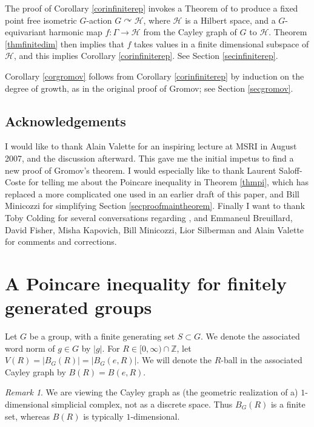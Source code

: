 \documentclass[12pt]{amsart}
\numberwithin{equation}{section}
\theoremstyle{plain}
\theoremstyle{remark}
\newtheorem{remark}[equation]{Remark}
\theoremstyle{definition}
\newcommand{\ra}{\rightarrow}
\newcommand{\h}{{\mathcal H}}
\newcommand{\Z}{\mathbb Z}
\newcommand{\acts}{\curvearrowright}
\def\ra{\rightarrow}
\begin{document}
\bigskip
The proof of Corollary \ref{corinfiniterep} invokes a Theorem 
of \cite{mok,korevaarschoen} to produce a fixed point
free isometric $G$-action $G\acts \h$, where $\h$ is 
a Hilbert space, and a $G$-equivariant
harmonic map $f:\Gamma\ra\h$ from the Cayley graph of $G$
to $\h$.  Theorem \ref{thmfinitedim} then implies that
$f$ takes values in a finite dimensional subspace of $\h$,
and this implies Corollary \ref{corinfiniterep}.
See Section \ref{secinfiniterep}.

\bigskip
Corollary \ref{corgromov} follows from Corollary \ref{corinfiniterep}
by induction on the degree of growth, as in the original 
proof of Gromov; see Section \ref{secgromov}.




\subsection{Acknowledgements}  I would like to
thank Alain Valette for an inspiring lecture 
at MSRI in August 2007, and the discussion afterward.
This gave me the initial impetus to find a new proof
of Gromov's theorem. 
I would especially like to thank Laurent Saloff-Coste
for telling me about the Poincare inequality in 
Theorem \ref{thmpi}, which has replaced a more complicated 
one used in an earlier draft of this paper,
and Bill Minicozzi for simplifying 
Section \ref{secproofmaintheorem}.
Finally I want to thank Toby Colding for several
conversations regarding  \cite{coldingminicozzi},
and Emmaneul Breuillard, David Fisher, Misha Kapovich, 
Bill Minicozzi, Lior Silberman and Alain Valette for 
comments and corrections.




\section{A Poincare inequality for finitely generated groups}

Let $G$ be a group, with a finite
generating set $S\subset G$.  We denote the
associated word norm of $g\in G$ by  $|g|$.
For $R\in [0,\infty)\cap \Z$, let $V(R)=|B_G(R)|=|B_G(e,R)|$.
We will denote the $R$-ball in the associated 
Cayley graph by $B(R)=B(e,R)$.  

\begin{remark} We are viewing the Cayley graph as (the
geometric realization of a) $1$-dimensional simplicial
complex, not as a discrete space.  Thus $B_G(R)$ is a finite
set, whereas $B(R)$ is typically $1$-dimensional.
\end{remark}
\end{document}
